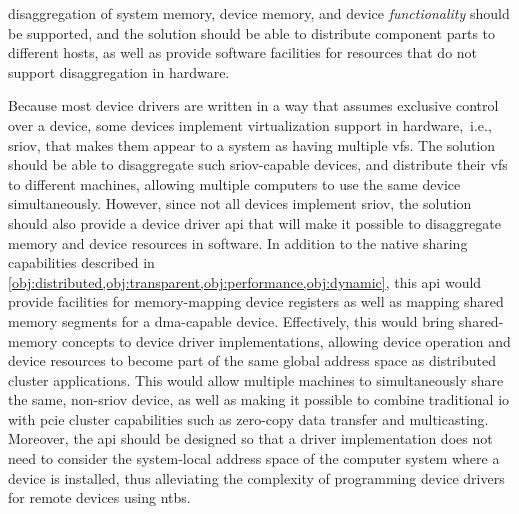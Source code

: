     
\begin{objective}\label{obj:disaggregation}
    \Gls{disaggregation} of system memory, device memory, and device \emph{functionality} should be supported, and the solution should be able to distribute component parts to different hosts, as well as provide software facilities for resources that do not support \gls{disaggregation} in hardware.
\end{objective}
Because most device drivers are written in a way that assumes exclusive control over a device, some devices implement virtualization support in hardware,~i.e., \gls{sriov}, that makes them appear to a system as having multiple \glspl{vf}. 
%
The solution should be able to \gls{disaggregate} such \gls{sriov}-capable devices, and distribute their \glspl{vf} to different machines, allowing multiple computers to use the same device simultaneously.
%
However, since not all devices implement \gls{sriov}, the solution should also provide a device driver \gls{api} that will make it possible to \gls{disaggregate} memory and device resources in software.
%
In addition to the native sharing capabilities described in \cref{obj:distributed,obj:transparent,obj:performance,obj:dynamic}, this \gls{api} 
would provide facilities for memory-mapping device registers as well as mapping shared memory segments for a \gls{dma}-capable device.
%
Effectively, this would bring shared-memory concepts to device driver implementations, allowing device operation and device resources to become part of the same global address space as distributed cluster applications.
%
This would allow multiple machines to simultaneously share the same, non-\gls{sriov} device, as well as making it possible to combine traditional \gls{io} with \gls{pcie} cluster capabilities such as zero-copy data transfer and multicasting.
%
Moreover, the \gls{api} should be designed so that a driver implementation does not need to consider the system-local address space of the computer system where a device is installed, thus alleviating the complexity of programming device drivers for remote devices using \glspl{ntb}.



